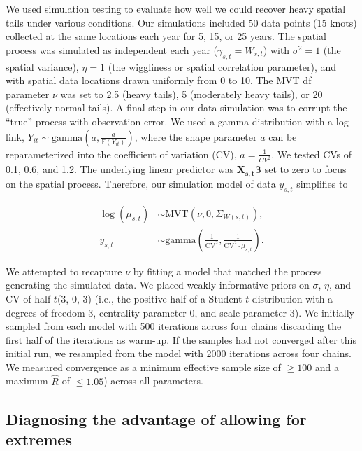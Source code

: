 \documentclass[12pt,english]{article}
\begin{document}
\begin{spacing}{1.9}
We used simulation testing to evaluate how well we could recover
heavy spatial tails under various conditions.
Our simulations included 50 data points (15 knots) collected at the same 
locations each year for 5, 15, or 25 years. The spatial process was simulated 
as independent each year ($\gamma_{s,t} = W_{s,t}$) with $\sigma^2 = 1$ 
(the spatial variance),
$\eta = 1$ (the wiggliness or spatial correlation parameter), and
with spatial data locations drawn uniformly from 0 to 10.
The MVT df parameter $\nu$ was set to 2.5 (heavy tails), 5 (moderately
heavy tails), or 20 (effectively normal tails). A final step in our data
simulation was to corrupt the ``true'' process with observation error. We used a gamma 
distribution with a log link, $Y_{it}\sim \mathrm{gamma}\left(a,\frac
  {a}{\mathbb{E}(Y_{it})} \right)$, where the shape parameter $a$ can be
reparameterized into the coefficient of variation (CV), $a=\frac{1}{CV^2}$. We
tested CVs of 0.1, 0.6, and 1.2. The underlying linear predictor was
$\bm{X_{s,t}} \bm{\beta}$ set to zero to focus on the spatial process. Therefore,
our simulation model of data $y_{s,t}$ simplifies to

\begin{align}
  \log(\mu_{s,t}) &\sim \mathrm{MVT}\left(\nu, 0, \Sigma_{W(s,t)}\right),\\
  y_{s,t} &\sim \mathrm{gamma} \left( \frac{1}{\mathrm{CV}^2},
  \frac{1}{\mathrm{CV}^2 \cdot \mu_{s,t} } \right).
\end{align}

We attempted to recapture $\nu$ by fitting a model that matched the process
generating the simulated data. We placed weakly informative priors on $\sigma$,
$\eta$, and CV of half-$t$(3, 0, 3) (i.e., the positive half of a Student-$t$
distribution with a degrees of freedom 3, centrality parameter 0, and scale
parameter 3). We initially sampled from each model with 500 iterations across
four chains discarding the first half of the iterations as warm-up. If the
samples had not converged after this initial run, we resampled from the model
with 2000 iterations across four chains. We measured convergence as a minimum
effective sample size of $\ge 100$ and a maximum $\hat{R}$ of $\le 1.05$)
across all parameters.

\subsection{Diagnosing the advantage of allowing for extremes}


\end{spacing}
\end{document}
